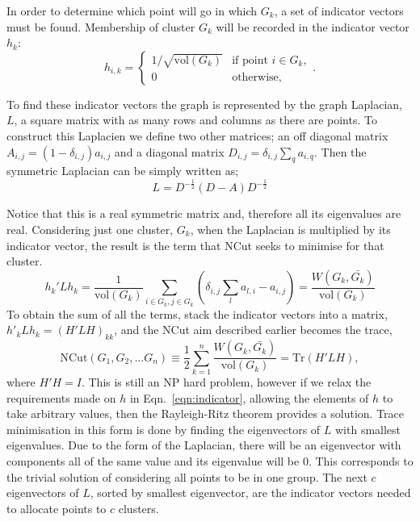 In order to determine which point will go in which \(G_k\), a set of indicator vectors must be found.
Membership of cluster \(G_k\) will be recorded in the indicator vector \(h_k\):
\begin{equation}\label{eqn:indicator}
    h_{i, k}= 
    \begin{cases}
        1/\sqrt{\text{vol}(G_k)}& \text{if point } i \in G_k ,\\
        0             & \text{otherwise},
    \end{cases}
    .
\end{equation}

To find these indicator vectors the graph is represented by the graph Laplacian, \(L\), a square
matrix with as many rows and columns as there are points.
To construct this Laplacien we define two other matrices;
an off diagonal matrix 
\(A_{i, j} = (1 - \delta_{i, j})a_{i, j}\)
and a diagonal matrix
\(D_{i, j} = \delta_{i, j}\sum_q a_{i, q}\).
Then the symmetric Laplacian can be simply written as;
\begin{equation}\label{eqn:symmetric_laplacian}
    L = D^{-\frac{1}{2}} (D - A) D^{-\frac{1}{2}}
\end{equation}

Notice that this is a real symmetric matrix
and, therefore all its eigenvalues are real.
Considering just one cluster, \(G_k\), when the Laplacian is multiplied by its indicator vector,
the result is the term that NCut seeks to minimise for that cluster.
\begin{equation}
    h_k'Lh_k = \frac{1}{\text{vol}(G_k)}\sum_{i \in G_k, j \in G_k} \left(\delta_{i, j}\sum_{l} a_{l, i} - a_{i, j} \right) = \frac{W(G_k, \bar{G_k})}{\text{vol}(G_k)}
\end{equation}
To obtain the sum of all the terms, stack the indicator vectors into a matrix,
\( h'_k L h_k = (H'L H)_{kk}\),
and the NCut aim described earlier becomes the trace,
\begin{equation} \text{NCut}(G_1,G_2, \dots G_n) \equiv \frac{1}{2} \sum_{k=1}^n \frac{W(G_k, \bar{G_k})}{\text{vol}(G_k)} = \text{Tr}(H'LH),\end{equation}
where \(H'H = I\).
This is still an NP hard problem, however if we relax the requirements made on \(h\) in Eqn.~\ref{eqn:indicator},
allowing the elements of \(h\) to take arbitrary values, then the Rayleigh-Ritz theorem provides a solution.
Trace minimisation in this form is done
by finding the eigenvectors of \(L\) with smallest 
eigenvalues.
Due to the form of the Laplacian, there will be an eigenvector with components all of the same value and its eigenvalue will be \(0\).
This corresponds to the trivial solution of considering all points to be in one group.
The next \(c\) eigenvectors of \(L\), sorted by smallest eigenvector, are the indicator vectors needed to allocate points to \(c\) clusters.

